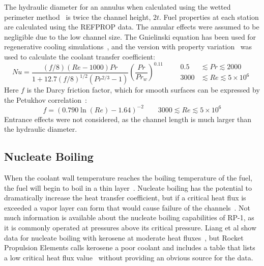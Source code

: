 \documentclass[11pt]{article}
\begin{document}
The hydraulic diameter for an annulus when calculated using the wetted perimeter method~\cite{bergman_fundamentals_2017} is twice the channel height, $2t$. Fuel properties at each station are calculated using the REFPROP data. The annular effects were assumed to be negligible due to the low channel size. The Gnielinski equation has been used for regenerative cooling simulations~\cite{marchi_numerical_2004}, and the version with property variation~\cite{gnielinski_neue_1975} was used to calculate the coolant transfer coefficient:
\begin{equation}
  Nu = \frac{(f/8)(Re - 1000)Pr}{1 + 12.7(f/8)^{1/2}(Pr^{2/3} - 1)} \left( \frac{Pr}{Pr_w} \right)^{0.11}
  \qquad
  \begin{aligned}
    0.5 & \lesssim Pr \lesssim 2000 \\
    3000 & \lesssim Re \lesssim 5 \times 10^6
  \end{aligned}
\end{equation}
Here $f$ is the Darcy friction factor, which for smooth surfaces can be expressed by the Petukhov correlation~\cite{bergman_fundamentals_2017}:
\begin{equation}
  f = (0.790 \ln (Re) - 1.64)^{-2} \qquad 3000 \lesssim Re \lesssim 5 \times 10^6
\end{equation}
Entrance effects were not considered, as the channel length is much larger than the hydraulic diameter.

\subsection{Nucleate Boiling}

When the coolant wall temperature reaches the boiling temperature of the fuel, the fuel will begin to boil in a thin layer~\cite{kandlikar_handbook_1999}. Nucleate boiling has the potential to dramatically increase the heat transfer coefficient, but if a critical heat flux is exceeded a vapor layer can form that would cause failure of the channels~\cite{huang_modern_1992}. Not much information is available about the nucleate boiling capabilities of RP-1, as it is commonly operated at pressures above its critical pressure. Liang et al show data for nucleate boiling with kerosene at moderate heat fluxes~\cite{liang_investigation_1998}, but Rocket Propulsion Elements calls kerosene a poor coolant and includes a table that lists a low critical heat flux value~\cite[Page 320]{sutton_rocket_2017} without providing an obvious source for the data.
\end{document}
